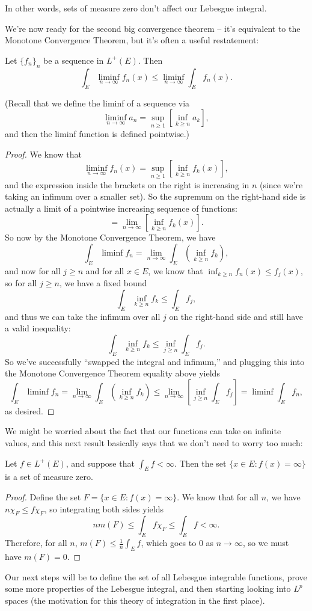 In other words, sets of measure zero don't affect our Lebesgue integral.

We're now ready for the second big convergence theorem -- it's equivalent to the Monotone Convergence Theorem, but it's often a useful restatement:

\begin{theorem}
Let $\{f_n\}_n$ be a sequence in $L^+(E)$. Then
\[
    \int_E \liminf_{n \to \infty} f_n(x) \le \liminf_{n \to \infty} \int_E f_n(x).
\]
\end{theorem}

(Recall that we define the liminf of a sequence via
\[
    \liminf_{n \to \infty} a_n = \sup_{n \ge 1}\left[\inf_{k \ge n} a_k\right],
\]
and then the liminf function is defined pointwise.)

\begin{proof}
We know that 
\[
    \liminf_{n \to \infty} f_n(x) = \sup_{n \ge 1}\left[\inf_{k \ge n} f_k(x)\right],
\]
and the expression inside the brackets on the right is increasing in $n$ (since we're taking an infimum over a smaller set). So the supremum on the right-hand side is actually a limit of a pointwise increasing sequence of functions:
\[
    = \lim_{n \to \infty} \left[\inf_{k \ge n} f_k(x)\right].
\]  
So now by the Monotone Convergence Theorem, we have
\[
   \int_E \liminf f_n = \lim_{n \to \infty} \int_E \left(\inf_{k \ge n} f_k\right),
\]
and now for all $j \ge n$ and for all $x \in E$, we know that $\inf_{k \ge n} f_n(x) \le f_j(x)$, so for all $j \ge n$, we have a fixed bound
\[
    \int_E \inf_{k \ge n} f_k \le \int_E f_j,
\]
and thus we can take the infimum over all $j$ on the right-hand side and still have a valid inequality:
\[
    \int_E \inf_{k \ge n} f_k \le \inf_{j \ge n} \int_E f_j.
\]
So we've successfully ``swapped the integral and infimum,'' and plugging this into the Monotone Convergence Theorem equality above yields
\[
    \int_E \liminf f_n = \lim_{n \to \infty} \int_E \left(\inf_{k \ge n} f_k\right) \le \lim_{n \to \infty}\left[\inf_{j \ge n} \int_E f_j\right] = \liminf \int_E f_n,
\]
as desired.
\end{proof}

We might be worried about the fact that our functions can take on infinite values, and this next result basically says that we don't need to worry too much:

\begin{theorem}
Let $f \in L^+(E)$, and suppose that $\int_E f < \infty$. Then the set $\{x \in E: f(x) = \infty\}$ is a set of measure zero.
\end{theorem}
\begin{proof}
Define the set $F = \{x \in E: f(x) = \infty\}$. We know that for all $n$, we have $n \chi_F \le f \chi_F$, so integrating both sides yields
\[
    n m(F) \le \int_E f \chi_F \le \int_E f < \infty.
\]
Therefore, for all $n$, $m(F) \le \frac{1}{n} \int_E f$, which goes to $0$ as $n \to \infty$, so we must have $m(F) = 0$.
\end{proof}

Our next steps will be to define the set of all Lebesgue integrable functions, prove some more properties of the Lebesgue integral, and then starting looking into $L^p$ spaces (the motivation for this theory of integration in the first place). 
